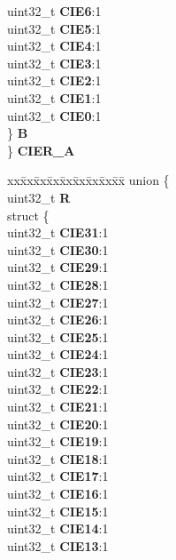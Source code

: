 \begin{DoxyCompactItemize}
\begin{tabbing}
\>\>uint32\_t {\bfseries CIE6}:1\\
\>\>uint32\_t {\bfseries CIE5}:1\\
\>\>uint32\_t {\bfseries CIE4}:1\\
\>\>uint32\_t {\bfseries CIE3}:1\\
\>\>uint32\_t {\bfseries CIE2}:1\\
\>\>uint32\_t {\bfseries CIE1}:1\\
\>\>uint32\_t {\bfseries CIE0}:1\\
\>\} {\bfseries B}\\
\} {\bfseries CIER\_A}\\

\end{tabbing}\item 
\mbox{\label{structETPU__tag_a7dc1d14c8d4bd6f1ae89fe36feee2d7d}} 
\begin{tabbing}
xx\=xx\=xx\=xx\=xx\=xx\=xx\=xx\=xx\=\kill
union \{\\
\>uint32\_t {\bfseries R}\\
\>struct \{\\
\>\>uint32\_t {\bfseries CIE31}:1\\
\>\>uint32\_t {\bfseries CIE30}:1\\
\>\>uint32\_t {\bfseries CIE29}:1\\
\>\>uint32\_t {\bfseries CIE28}:1\\
\>\>uint32\_t {\bfseries CIE27}:1\\
\>\>uint32\_t {\bfseries CIE26}:1\\
\>\>uint32\_t {\bfseries CIE25}:1\\
\>\>uint32\_t {\bfseries CIE24}:1\\
\>\>uint32\_t {\bfseries CIE23}:1\\
\>\>uint32\_t {\bfseries CIE22}:1\\
\>\>uint32\_t {\bfseries CIE21}:1\\
\>\>uint32\_t {\bfseries CIE20}:1\\
\>\>uint32\_t {\bfseries CIE19}:1\\
\>\>uint32\_t {\bfseries CIE18}:1\\
\>\>uint32\_t {\bfseries CIE17}:1\\
\>\>uint32\_t {\bfseries CIE16}:1\\
\>\>uint32\_t {\bfseries CIE15}:1\\
\>\>uint32\_t {\bfseries CIE14}:1\\
\>\>uint32\_t {\bfseries CIE13}:1\\

\end{tabbing}
\end{DoxyCompactItemize}
